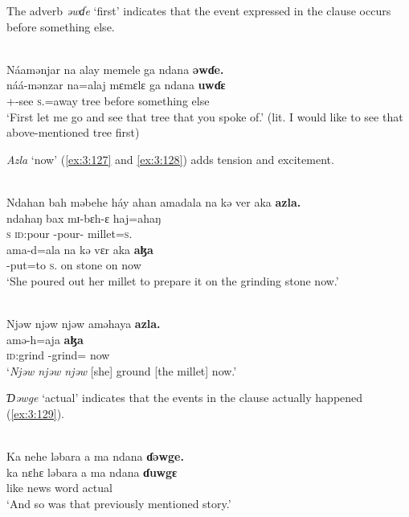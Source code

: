 The adverb \textit{əwɗe} ‘first’  indicates that the event expressed in the clause occurs before something else. 

\ea \label{ex:3:126}\\
Náamənjar  na  alay  memele  ga  ndana \textbf{  əwɗe.}\\
\gll náá-mənzar    na=alaj    mɛmɛlɛ  ga  ndana  \textbf{uwɗɛ}\\
      {\oneS}+{\POT}-see \textsc{s}.{\DO}=away    tree  {\ADJ}  {\DEM}  {before something else}\\
\glt  ‘First let me go and see that tree that you spoke of.’ (lit. I would like to see that above-mentioned tree first)
\z

\textit{Azla} ‘now’ (\ref{ex:3:127} and \ref{ex:3:128}) adds tension and excitement.

\ea \label{ex:3:127}\\
Ndahan  bah  məbehe  háy  ahan  amadala  na  kə  ver  aka  \textbf{azla.}\\
\gll  ndahaŋ  bax      mɪ-bɛh-ɛ    haj=ahaŋ\\
      \textsc{s}              \textsc{id}:pour  {\NOM}{}-pour-{\CL}  millet=\textsc{s}.{\POSS}\\
\medskip
\gll  ama-d=ala  na        kə     vɛr         aka  \textbf{aɮa}\\
      {\DEP}-put=to    \textsc{s}.{\DO}  on  stone     on     now\\
\glt  ‘She poured out her millet to prepare it on the grinding stone now.’
\z

\ea \label{ex:3:128}\\
Njəw  njəw  njəw  aməhaya  \textbf{azla.}\\
   amə-h=aja  \textbf{aɮa}\\
      \textsc{id}:grind    {\DEP}-grind={\PLU}  now\\
\glt  ‘\textit{Njəw  njəw  njəw} [she] ground [the millet] now.’
\z

\textit{Ɗəwge} ‘actual’ indicates that the events in the clause actually happened (\ref{ex:3:129}).


\ea \label{ex:3:129}\\
Ka  nehe  ləbara  a  ma  ndana  \textbf{ɗəwge.}\\    
\gll ka  nɛhɛ  ləbara     a       ma      ndana     \textbf{ɗuwgɛ}\\     
    like  {\DEM}  news   {\GEN}    word     {\DEM}   actual\\
\glt ‘And so was that  previously mentioned story.’
\z

